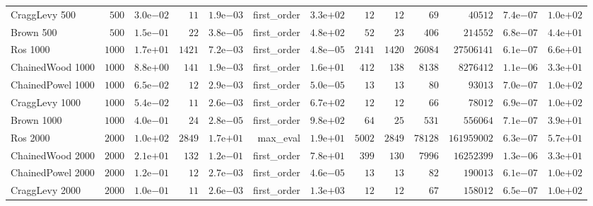 \begin{longtable}[c]{lrrrrrrrrrrrr}
CraggLevy 500 & \(  500\) & \( 3.0\)e\(-02\) & \(   11\) & \( 1.9\)e\(-03\) & first\_order & \( 3.3\)e\(+02\) & \(   12\) & \(   12\) & \(   69\) & \(40512\) & \( 7.4\)e\(-07\) & \( 1.0\)e\(+02\) \\
Brown 500 & \(  500\) & \( 1.5\)e\(-01\) & \(   22\) & \( 3.8\)e\(-05\) & first\_order & \( 4.8\)e\(+02\) & \(   52\) & \(   23\) & \(  406\) & \(214552\) & \( 6.8\)e\(-07\) & \( 4.4\)e\(+01\) \\
Ros 1000 & \( 1000\) & \( 1.7\)e\(+01\) & \( 1421\) & \( 7.2\)e\(-03\) & first\_order & \( 4.8\)e\(-05\) & \( 2141\) & \( 1420\) & \(26084\) & \(27506141\) & \( 6.1\)e\(-07\) & \( 6.6\)e\(+01\) \\
ChainedWood 1000 & \( 1000\) & \( 8.8\)e\(+00\) & \(  141\) & \( 1.9\)e\(-03\) & first\_order & \( 1.6\)e\(+01\) & \(  412\) & \(  138\) & \( 8138\) & \(8276412\) & \( 1.1\)e\(-06\) & \( 3.3\)e\(+01\) \\
ChainedPowel 1000 & \( 1000\) & \( 6.5\)e\(-02\) & \(   12\) & \( 2.9\)e\(-03\) & first\_order & \( 5.0\)e\(-05\) & \(   13\) & \(   13\) & \(   80\) & \(93013\) & \( 7.0\)e\(-07\) & \( 1.0\)e\(+02\) \\
CraggLevy 1000 & \( 1000\) & \( 5.4\)e\(-02\) & \(   11\) & \( 2.6\)e\(-03\) & first\_order & \( 6.7\)e\(+02\) & \(   12\) & \(   12\) & \(   66\) & \(78012\) & \( 6.9\)e\(-07\) & \( 1.0\)e\(+02\) \\
Brown 1000 & \( 1000\) & \( 4.0\)e\(-01\) & \(   24\) & \( 2.8\)e\(-05\) & first\_order & \( 9.8\)e\(+02\) & \(   64\) & \(   25\) & \(  531\) & \(556064\) & \( 7.1\)e\(-07\) & \( 3.9\)e\(+01\) \\
Ros 2000 & \( 2000\) & \( 1.0\)e\(+02\) & \( 2849\) & \( 1.7\)e\(+01\) & max\_eval & \( 1.9\)e\(+01\) & \( 5002\) & \( 2849\) & \(78128\) & \(161959002\) & \( 6.3\)e\(-07\) & \( 5.7\)e\(+01\) \\
ChainedWood 2000 & \( 2000\) & \( 2.1\)e\(+01\) & \(  132\) & \( 1.2\)e\(-01\) & first\_order & \( 7.8\)e\(+01\) & \(  399\) & \(  130\) & \( 7996\) & \(16252399\) & \( 1.3\)e\(-06\) & \( 3.3\)e\(+01\) \\
ChainedPowel 2000 & \( 2000\) & \( 1.2\)e\(-01\) & \(   12\) & \( 2.7\)e\(-03\) & first\_order & \( 4.6\)e\(-05\) & \(   13\) & \(   13\) & \(   82\) & \(190013\) & \( 6.1\)e\(-07\) & \( 1.0\)e\(+02\) \\
CraggLevy 2000 & \( 2000\) & \( 1.0\)e\(-01\) & \(   11\) & \( 2.6\)e\(-03\) & first\_order & \( 1.3\)e\(+03\) & \(   12\) & \(   12\) & \(   67\) & \(158012\) & \( 6.5\)e\(-07\) & \( 1.0\)e\(+02\) \\

\end{longtable}
